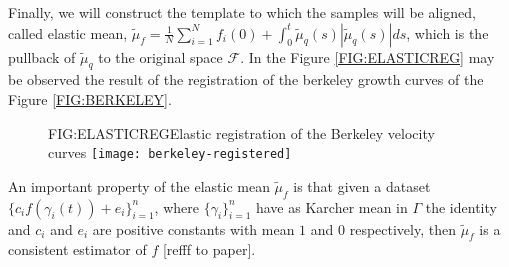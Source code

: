 Finally, we will construct the template to which the samples will be aligned,
called elastic mean,
$\tilde \mu_f = \frac{1}{N} \sum_{i=1}^N f_i(0) +
\int_0^t \tilde \mu_q(s) | \tilde \mu_q(s)| ds$,
which is the pullback of $\tilde \mu_q$ to the original space $\mathcal{F}$. In
the Figure \ref{FIG:ELASTICREG} may be observed the result of the registration of the
berkeley growth curves of the Figure \ref{FIG:BERKELEY}.

\begin{figure}[Elastic registration of the Berkeley velocity curves]{FIG:ELASTICREG}{Elastic registration of the Berkeley velocity curves}
  \texttt{[image: berkeley-registered]}
\end{figure}

An important property of the elastic mean
$\tilde \mu_f$ is that given a dataset $\{c_i f(\gamma_i(t)) + e_i\}_{i=1}^{n}$, where
$\{\gamma_i\}_{i=1}^{n}$ have as Karcher mean in $\Gamma$ the identity and $c_i$ and $e_i$ are positive
constants with mean $1$ and $0$ respectively, then $\tilde \mu_f$ is a
consistent estimator of $f$ [refff to paper].

